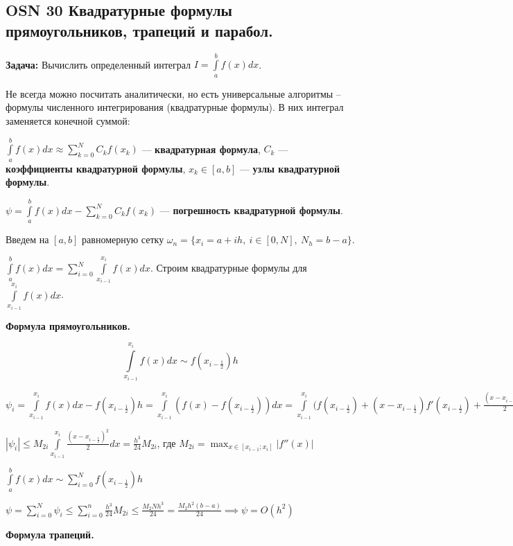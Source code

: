 \subsection*{OSN 30 Квадратурные формулы прямоугольников, трапеций и парабол.}

\textbf{Задача:} Вычислить определенный интеграл $I = \int\limits_a^b f(x)dx$.

Не всегда можно посчитать аналитически, но есть универсальные алгоритмы -- формулы численного интегрирования (квадратурные формулы). 
В них интеграл заменяется конечной суммой:

$ \int\limits_a^b f(x)dx \approx\displaystyle\sum_{k=0}^N C_k f(x_k)$ --- \textbf{квадратурная формула}, 
$C_k$ --- \textbf{коэффициенты квадратурной формулы}, 
$x_k \in [a, b]$ --- \textbf{узлы квадратурной формулы}.

$\psi = \int\limits_a^b f(x)dx - \sum_{k=0}^N C_k f(x_k) $ --- \textbf{погрешность квадратурной формулы}. 

Введем на $[a,b]$ равномерную сетку $\omega_n = \{x_i =a+ih,~i\in[0,N],~N_h=b-a \}$.

$\int\limits_a^b f(x)dx = \displaystyle\sum_{i=0}^N\int\limits_{x_{i-1}}^{x_i} f(x)dx$. Строим квадратурные формулы для $\int\limits_{x_{i-1}}^{x_i} f(x)dx$.

\textbf{Формула прямоугольников.}

$$ \int\limits_{x_{i-1}}^{x_i} f(x)dx \sim f \left( x_{i-\frac{1}{2}} \right) h $$

$\psi_i = \int\limits_{x_{i-1}}^{x_i} f(x)dx - f \left( x_{i-\frac{1}{2}} \right)h = 
\int\limits_{x_{i-1}}^{x_i} \left( f(x) - f\left(x_{i-\frac{1}{2}} \right) \right)dx = 
\int\limits_{x_{i-1}}^{x_i} 
\Biggl( 
    f(x_{i-\frac{1}{2}}) + 
    (x - x_{i-\frac{1}{2}})f'(x_{i-\frac{1}{2}}) + 
    \frac{\left(x - x_{i-\frac{1}{2}}\right)^2}{2}f''(\xi) 
    \Biggr|_{\xi \in [x_{i-1};x_i]} - 
    f(x_{i-\frac{1}{2}}) 
\Biggr) dx$

$|\psi_i| \leqslant 
M_{2i} \int\limits_{x_{i-1}}^{x_i} \frac{ \left(x - x_{i-\frac{1}{2}} \right)^2}{2}dx = 
\frac{h^3}{24} M_{2i}$, где $ M_{2i} = \displaystyle\max_{x\in[x_{i-1};x_i]}|f''(x)|$

$\int\limits_a^b f(x)dx \sim \displaystyle\sum_{i=0}^N f(x_{i-\frac{1}{2}})h$

$\psi = \displaystyle\sum_{i=0}^N \psi_i \leqslant \displaystyle\sum_{i=0}^n \frac{h^3}{24} M_{2i}\leqslant \frac{M_2Nh^3}{24} = \frac{M_2h^2(b-a)}{24} \implies \psi = O(h^2)$

\textbf{Формула трапеций.}

